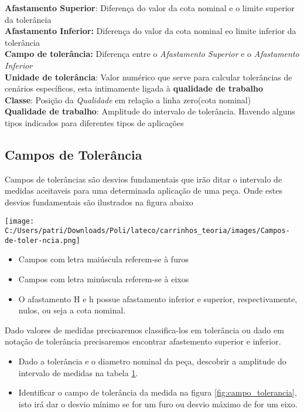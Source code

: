 \textbf{Afastamento Superior}: Diferença do valor da cota nominal e o limite superior da tolerância \\
\textbf{Afastamento Inferior:} Diferença do valor da cota nominal eo limite inferior da tolerância \\
\textbf{Campo de tolerância:} Diferença entre o \textit{Afastamento Superior} e o \textit{Afastamento Inferior} \\
\textbf{Unidade de tolerância}: Valor numérico que serve para calcular tolerâncias de cenários específicos, esta intimamente ligada à \textbf{qualidade de trabalho}\\
\textbf{Classe}: Posição da \textit{Qualidade} em relação a linha zero(cota nominal)\\
\textbf{Qualidade de trabalho}: Amplitude do intervalo de tolerância. Havendo alguns tipos indicados para diferentes tipos de aplicações\\

\subsection{Campos de Tolerância}

Campos de tolerâncias são desvios fundamentais que irão ditar o intervalo de medidas aceitaveis para uma determinada aplicação de uma peça. Onde estes desvios fundamentais são ilustrados na figura abaixo

\texttt{[image: C:/Users/patri/Downloads/Poli/lateco/carrinhos\_teoria/images/Campos-de-toler-ncia.png]}
\label{fig:campo_tolerancia}

\begin{itemize}
	\item Campos com letra maiúscula referem-se à furos
	\item Campos com letra minúscula referem-se à eixos
	\item O afastamento H e h possue afastamento inferior e superior, respectivamente, nulos, ou seja a cota nominal.
\end{itemize}

\begin{namedtheorem}
  Dado valores de medidas precisaremos classifica-los em tolerância ou dado em notação de tolerância precisaremos encontrar afastemento superior e inferior.

	\begin{itemize}
		\item Dado a tolerância e o diametro nominal da peça, descobrir a amplitude do intervalo de medidas na tabela \href{https://i.ibb.co/4dn7gK4/Tabela-1.png}{1}.
		\item Identificar o campo de tolerância da medida na figura \ref{fig:campo_tolerancia}, isto irá dar o desvio mínimo se for um furo ou desvio máximo de for um eixo.
	\end{itemize}
	
\end{namedtheorem}


